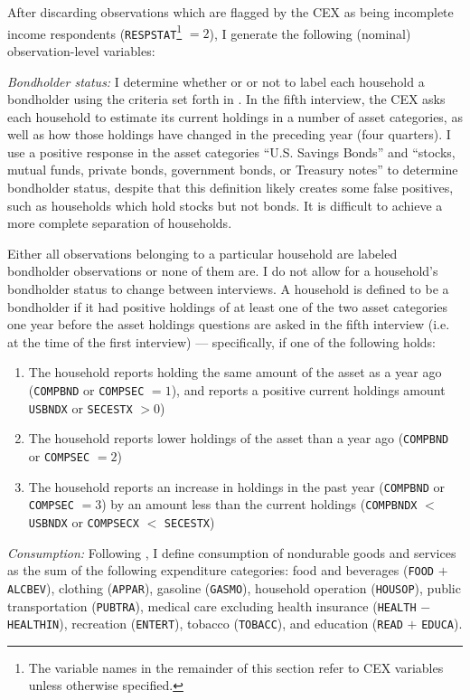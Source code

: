 After discarding observations which are flagged by the CEX as being incomplete income respondents (\texttt{RESPSTAT}\footnote{The variable names in the remainder of this section refer to CEX variables unless otherwise specified.} $= 2$), I generate the following (nominal) observation-level variables:

\textit{Bondholder status:} I determine whether or or not to label each household a bondholder using the criteria set forth in \cite{vissing02}. In the fifth interview, the CEX asks each household to estimate its current holdings in a number of asset categories, as well as how those holdings have changed in the preceding year (four quarters). I use a positive response in the asset categories ``U.S. Savings Bonds'' and ``stocks, mutual funds, private bonds, government bonds, or Treasury notes'' to determine bondholder status, despite that this definition likely creates some false positives, such as households which hold stocks but not bonds. It is difficult to achieve a more complete separation of households.

Either all observations belonging to a particular household are labeled bondholder observations or none of them are. I do not allow for a household's bondholder status to change between interviews. A household is defined to be a bondholder if it had positive holdings of at least one of the two asset categories one year before the asset holdings questions are asked in the fifth interview (i.e. at the time of the first interview) --- specifically, if one of the following holds:
\begin{enumerate}
\item The household reports holding the same amount of the asset as a year ago (\texttt{COMPBND} or \texttt{COMPSEC} $= 1$), and reports a positive current holdings amount \texttt{USBNDX} or \texttt{SECESTX} $> 0$)
\item The household reports lower holdings of the asset than a year ago (\texttt{COMPBND} or \texttt{COMPSEC} $= 2$)
\item The household reports an increase in holdings in the past year (\texttt{COMPBND} or \texttt{COMPSEC} $= 3$) by an amount less than the current holdings (\texttt{COMPBNDX} $<$ \texttt{USBNDX} or \texttt{COMPSECX} $<$ \texttt{SECESTX})
\end{enumerate}

\textit{Consumption:} Following \cite{heathcote10}, I define consumption of nondurable goods and services as the sum of the following expenditure categories: food and beverages (\texttt{FOOD} $+$ \texttt{ALCBEV}), clothing (\texttt{APPAR}), gasoline (\texttt{GASMO}), household operation (\texttt{HOUSOP}), public transportation (\texttt{PUBTRA}), medical care excluding health insurance (\texttt{HEALTH} $-$ \texttt{HEALTHIN}), recreation (\texttt{ENTERT}), tobacco (\texttt{TOBACC}), and education (\texttt{READ} $+$ \texttt{EDUCA}).

